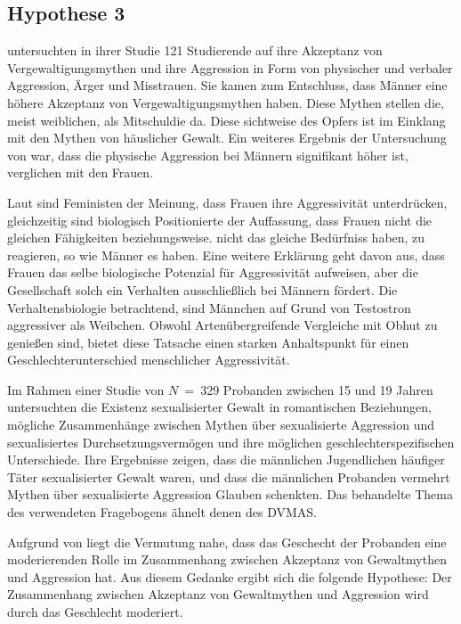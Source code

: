 \subsection{Hypothese 3}    \label{subsec_2.2.3}
\textcite{H2_u_3_Bhogal_2016} untersuchten in ihrer Studie 121 Studierende auf ihre Akzeptanz von Vergewaltigungsmythen und ihre Aggression in Form von physischer und verbaler Aggression, Ärger und Misstrauen. Sie kamen zum Entschluss, dass Männer eine höhere Akzeptanz von Vergewaltigungsmythen haben. Diese Mythen stellen die, meist weiblichen, als Mitschuldie da. Diese sichtweise des Opfers ist im Einklang mit den Mythen von häuslicher Gewalt. Ein weiteres Ergebnis der Untersuchung von \textcite{H2_u_3_Bhogal_2016} war, dass die physische Aggression bei Männern signifikant höher ist, verglichen mit den Frauen.

Laut \textcite{H3_MFUnterschied} sind Feministen der Meinung, dass Frauen ihre Aggressivität unterdrücken, gleichzeitig sind biologisch Positionierte der Auffassung, dass Frauen nicht die gleichen Fähigkeiten beziehungsweise. nicht das gleiche Bedürfniss haben, zu reagieren, so wie Männer es haben. Eine weitere Erklärung geht davon aus, dass Frauen das selbe biologische Potenzial für Aggressivität aufweisen, aber die Gesellschaft solch ein Verhalten ausschließlich bei Männern fördert. Die Verhaltensbiologie betrachtend, sind Männchen auf Grund von Testostron aggressiver als Weibchen. Obwohl Artenübergreifende Vergleiche mit Obhut zu genießen sind, bietet diese Tatsache einen starken Anhaltspunkt für einen Geschlechterunterschied menschlicher Aggressivität.

Im Rahmen einer Studie von $N$~=~329 Probanden zwischen 15 und 19 Jahren untersuchten \textcite{H3_2020} die Existenz sexualisierter Gewalt in romantischen Beziehungen, mögliche Zusammenhänge zwischen Mythen über sexualisierte Aggression und sexualisiertes Durchsetzungsvermögen und ihre möglichen geschlechterspezifischen Unterschiede. Ihre Ergebnisse zeigen, dass die männlichen Jugendlichen häufiger Täter sexualisierter Gewalt waren, und dass die männlichen Probanden vermehrt Mythen über sexualisierte Aggression Glauben schenkten. Das behandelte Thema des verwendeten Fragebogens ähnelt denen des DVMAS.

Aufgrund von \textcite{H2_u_3_Bhogal_2016, H3_MFUnterschied, H3_2020} liegt die Vermutung nahe, dass das Geschecht der Probanden eine moderierenden Rolle im Zusammenhang zwischen Akzeptanz von Gewaltmythen und Aggression hat. Aus diesem Gedanke ergibt sich die folgende Hypothese: Der Zusammenhang zwischen Akzeptanz von Gewaltmythen und Aggression wird durch das Geschlecht moderiert.


